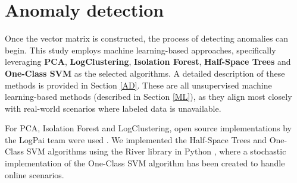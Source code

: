 \section{Anomaly detection}
Once the vector matrix is constructed, the process of detecting anomalies can begin. This study employs machine learning-based approaches, specifically leveraging \textbf{PCA}, \textbf{LogClustering}, \textbf{Isolation Forest}, \textbf{Half-Space Trees} and \textbf{One-Class SVM} as the selected algorithms. A detailed description of these methods is provided in Section \ref{AD}. These are all unsupervised machine learning-based methods (described in Section \ref{ML}), as they align most closely with real-world scenarios where labeled data is unavailable.  

For PCA, Isolation Forest and LogClustering, open source implementations by the LogPai team were used \cite{Shilin2017experiencereport}.  We implemented the Half-Space Trees and One-Class SVM algorithms using the River library in Python \cite{montiel2021river}, where a stochastic implementation of the One-Class SVM algorithm has been created to handle online scenarios.




